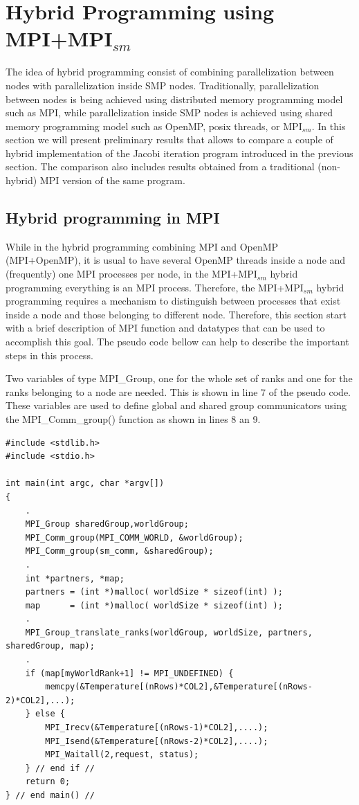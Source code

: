 \section{Hybrid Programming using MPI+MPI$_{sm}$}
The idea of hybrid programming consist of combining parallelization between nodes with parallelization inside SMP nodes. Traditionally, parallelization between nodes is being achieved using distributed memory programming model such as MPI, while parallelization inside SMP nodes is achieved using shared memory programming model such as OpenMP, posix threads, or MPI$_{sm}$. In this section we will present preliminary results that allows to compare a couple of hybrid implementation of the Jacobi iteration program introduced in the previous section. The comparison also includes results obtained from a traditional (non-hybrid) MPI version of the same program.

\medskip

\subsection*{Hybrid programming in MPI}
While in the hybrid programming combining MPI and OpenMP (MPI+OpenMP), it is usual to have several OpenMP threads inside a node and (frequently) one MPI processes per node, in the MPI+MPI$_{sm}$ hybrid programming everything is an MPI process. Therefore, the MPI+MPI$_{sm}$ hybrid programming requires a mechanism to distinguish between processes that exist inside a node and those belonging to different node. Therefore, this section start with a brief description of MPI function and datatypes that can be used to accomplish this goal. The pseudo code bellow can help to describe the important steps in this process. 

\medskip
Two variables of type MPI\_Group, one for the whole set of ranks and one for the ranks belonging to a node are needed. This is shown in line 7 of the pseudo code. These variables are used to define global and shared group communicators using the MPI\_Comm\_group() function as shown in lines 8 an 9. 


\begin{lstlisting}[style=CStyle]
#include <stdlib.h>
#include <stdio.h>

int main(int argc, char *argv[]) 
{
    .
    MPI_Group sharedGroup,worldGroup;
    MPI_Comm_group(MPI_COMM_WORLD, &worldGroup);
    MPI_Comm_group(sm_comm, &sharedGroup);
    .
    int *partners, *map;
    partners = (int *)malloc( worldSize * sizeof(int) );
    map      = (int *)malloc( worldSize * sizeof(int) );
    .
    MPI_Group_translate_ranks(worldGroup, worldSize, partners, sharedGroup, map);
    .
    if (map[myWorldRank+1] != MPI_UNDEFINED) {
        memcpy(&Temperature[(nRows)*COL2],&Temperature[(nRows-2)*COL2],...);
    } else {
        MPI_Irecv(&Temperature[(nRows-1)*COL2],....);
        MPI_Isend(&Temperature[(nRows-2)*COL2],....);
        MPI_Waitall(2,request, status);
    } // end if //  
    return 0;
} // end main() // 
\end{lstlisting}


